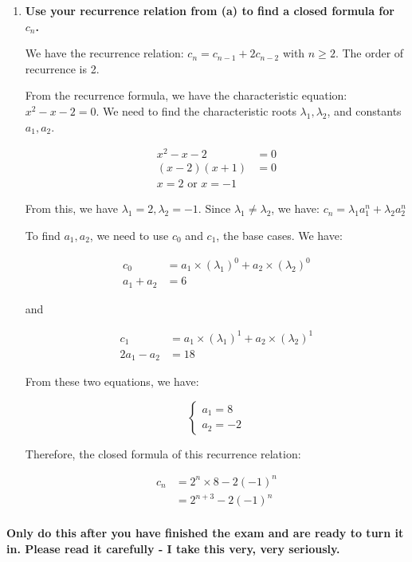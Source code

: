 \documentclass[10pt]{article}
\begin{document}
\begin{enumerate}
\begin{enumerate}
\[c_n=\begin{cases}
6 & n =0\\
18 &  n=1\\
c_{n-1} + 2c_{n-2} & n \geq 2\\
\end{cases}\]

\item
\textbf{Use your recurrence relation from (a) to find a closed formula for $c_n$.}

We have the recurrence relation: $c_n = c_{n-1} + 2c_{n-2}$ with $n \geq 2$. The order of recurrence is 2.

From the recurrence formula, we have the characteristic equation: $x^2 -x -2=0$. We need to find the characteristic roots $\lambda_1, \lambda_2$, and constants $a_1, a_2$.

\begin{align*}
    x^2 -x -2&=0\\
    (x-2)(x+1)&=0\\
    x = 2 \text{ or } x =-1
\end{align*}

From this, we have $\lambda_1=2, \lambda_2=-1$. Since $\lambda_1 \neq \lambda_2$, we have: $c_n = \lambda_1a_1^n +  \lambda_2a_2^n $

To find $a_1, a_2$, we need to use $c_0$ and $c_1$, the base cases. We have:

\begin{align*}
    c_0 &= a_1\times(\lambda_1)^0+a_2\times(\lambda_2)^0 \\
    a_1 +a_2 &= 6
\end{align*}

and 

\begin{align*}
    c_1 &= a_1\times(\lambda_1)^1+a_2\times(\lambda_2)^1 \\
    2a_1 - a_2 &= 18
\end{align*}

From these two equations, we have:

\[\begin{cases}
a_1 = 8\\
a_2 = -2
\end{cases}\]

Therefore, the closed formula of this recurrence relation:

\begin{align*}
c_n&= 2^n\times8 - 2(-1)^n\\
&= 2^{n+3} - 2(-1)^n\\
\end{align*}

\end{enumerate}




\newpage
{\bf Only do this after you have finished the exam and are ready to turn it in.  Please read it carefully - I take this very, very seriously.}
\end{enumerate}
\end{document}
